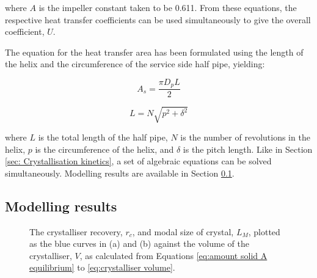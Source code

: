 \noindent where $A$ is the impeller constant taken to be 0.611. From these equations, the respective heat transfer coefficients can be used simultaneously to give the overall coefficient, $U$.

The equation for the heat transfer area has been formulated using the length of the helix and the circumference of the service side half pipe, yielding:

\begin{equation} \label{eq:coolantpipesa}
    A_s = \frac{\pi D_p L}{2}
    \end{equation}
    
\begin{equation}\label{eq:helixlength}
    L = N \sqrt{p^2 + \delta^2}
\end{equation}

\noindent where $L$ is the total length of the half pipe, $N$ is the number of revolutions in the helix, $p$ is the circumference of the helix, and $\delta$ is the pitch length. Like in Section \ref{sec: Crystallisation kinetics}, a set of algebraic equations can be solved simultaneously. Modelling results are available in Section \ref{sec:modelling results crystalliser}.

\subsection{Modelling results}\label{sec:modelling results crystalliser}

\begin{figure}[h]
    \centering
    
    \caption{The crystalliser recovery, $r_c$, and modal size of crystal, $L_M$, plotted as the blue curves in (a) and (b) against the volume of the crystalliser, $V$, as calculated from Equations \ref{eq:amount solid A equilibrium} to \ref{eq:crystalliser volume}. }
    \label{fig:recovery vs volume crystalliser}
\end{figure}

